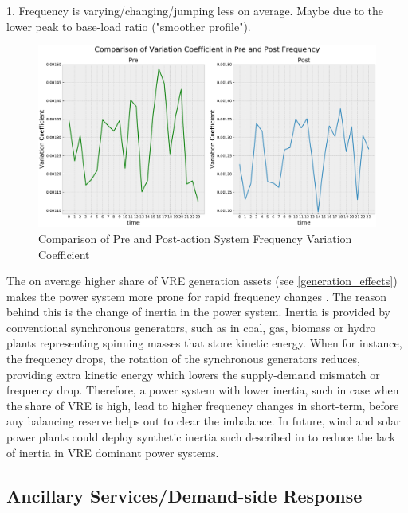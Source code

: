 \documentclass[energies,article,submit,moreauthors,pdftex]{Definitions/mdpi}
\begin{document}
1. Frequency is varying/changing/jumping less on average. Maybe due to the lower peak to base-load ratio ("smoother profile").

\begin{figure}[H]
\centering
\hspace{-25pt}\includegraphics[width=16.5 cm]{Graphics/FFreq_VarCoeff_comp_2.pdf}
\caption{Comparison of Pre and Post-action System Frequency Variation Coefficient} \label{fig:freq_hist}
\end{figure}  

The on average higher share of VRE generation assets (see \ref{generation_effects}) makes the power system more prone for rapid frequency changes \cite{Ela2011OperatingReserves.}. The reason behind this is the change of inertia in the power system. Inertia is provided by conventional synchronous generators, such as in coal, gas, biomass or hydro plants representing spinning masses that store kinetic energy. When for instance, the frequency drops, the rotation of the synchronous generators reduces, providing extra kinetic energy which lowers the supply-demand mismatch or frequency drop. Therefore, a power system with lower inertia, such in case when the share of VRE is high, lead to higher frequency changes in short-term, before any balancing reserve helps out to clear the imbalance. In future, wind and solar power plants could deploy synthetic inertia such described in \cite{Hansen2014AnalysisTurbines, Zeni2013VirtualTurbines, Liu2017PV-basedSystem} to reduce the lack of inertia in VRE dominant power systems.



\subsection{Ancillary Services/Demand-side Response}
\end{document}
